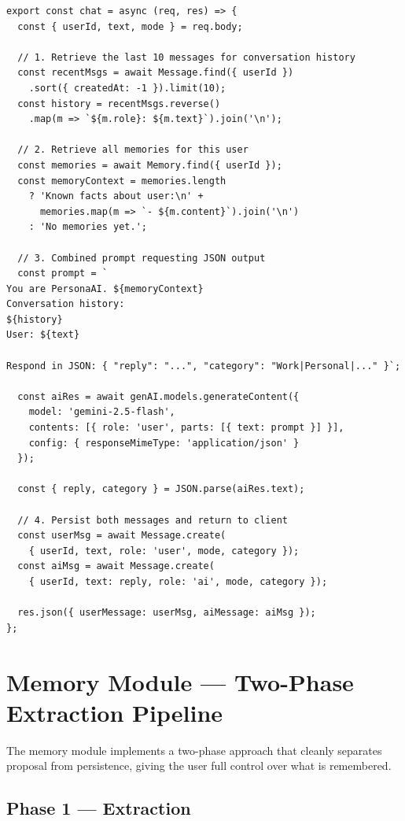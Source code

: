 \documentclass[12pt,a4paper]{report}
\begin{document}
\begin{lstlisting}[caption={chatController.js — Combined Prompt and Memory Injection}]
export const chat = async (req, res) => {
  const { userId, text, mode } = req.body;

  // 1. Retrieve the last 10 messages for conversation history
  const recentMsgs = await Message.find({ userId })
    .sort({ createdAt: -1 }).limit(10);
  const history = recentMsgs.reverse()
    .map(m => `${m.role}: ${m.text}`).join('\n');

  // 2. Retrieve all memories for this user
  const memories = await Memory.find({ userId });
  const memoryContext = memories.length
    ? 'Known facts about user:\n' +
      memories.map(m => `- ${m.content}`).join('\n')
    : 'No memories yet.';

  // 3. Combined prompt requesting JSON output
  const prompt = `
You are PersonaAI. ${memoryContext}
Conversation history:
${history}
User: ${text}

Respond in JSON: { "reply": "...", "category": "Work|Personal|..." }`;

  const aiRes = await genAI.models.generateContent({
    model: 'gemini-2.5-flash',
    contents: [{ role: 'user', parts: [{ text: prompt }] }],
    config: { responseMimeType: 'application/json' }
  });

  const { reply, category } = JSON.parse(aiRes.text);

  // 4. Persist both messages and return to client
  const userMsg = await Message.create(
    { userId, text, role: 'user', mode, category });
  const aiMsg = await Message.create(
    { userId, text: reply, role: 'ai', mode, category });

  res.json({ userMessage: userMsg, aiMessage: aiMsg });
};
\end{lstlisting}

\section{Memory Module — Two-Phase Extraction Pipeline}

The memory module implements a two-phase approach that cleanly separates proposal from persistence, giving the user full control over what is remembered.

\subsection{Phase 1 — Extraction}
\end{document}
